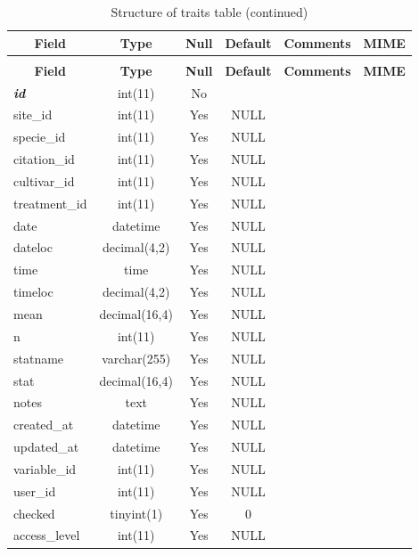 \begin{enumerate}
%
%
 \begin{longtable}{|l|c|c|c|l|l|} 
 \caption{Structure of traits table} \label{tab:traits} \\
 \hline \multicolumn{1}{|c|}{\textbf{Field}} & \multicolumn{1}{|c|}{\textbf{Type}} & \multicolumn{1}{|c|}{\textbf{Null}} & \multicolumn{1}{|c|}{\textbf{Default}} & \multicolumn{1}{|c|}{\textbf{Comments}} & \multicolumn{1}{|c|}{\textbf{MIME}} \\ \hline \hline
\endfirsthead
 \caption{Structure of traits table (continued)} \\ 
 \hline \multicolumn{1}{|c|}{\textbf{Field}} & \multicolumn{1}{|c|}{\textbf{Type}} & \multicolumn{1}{|c|}{\textbf{Null}} & \multicolumn{1}{|c|}{\textbf{Default}} & \multicolumn{1}{|c|}{\textbf{Comments}} & \multicolumn{1}{|c|}{\textbf{MIME}} \\ \hline \hline \endhead \endfoot 
\textbf{\textit{id}} & int(11) & No &  &  &  \\ \hline 
site\_id & int(11) & Yes & NULL &  &  \\ \hline 
specie\_id & int(11) & Yes & NULL &  &  \\ \hline 
citation\_id & int(11) & Yes & NULL &  &  \\ \hline 
cultivar\_id & int(11) & Yes & NULL &  &  \\ \hline 
treatment\_id & int(11) & Yes & NULL &  &  \\ \hline 
date & datetime & Yes & NULL &  &  \\ \hline 
dateloc & decimal(4,2) & Yes & NULL &  &  \\ \hline 
time & time & Yes & NULL &  &  \\ \hline 
timeloc & decimal(4,2) & Yes & NULL &  &  \\ \hline 
mean & decimal(16,4) & Yes & NULL &  &  \\ \hline 
n & int(11) & Yes & NULL &  &  \\ \hline 
statname & varchar(255) & Yes & NULL &  &  \\ \hline 
stat & decimal(16,4) & Yes & NULL &  &  \\ \hline 
notes & text & Yes & NULL &  &  \\ \hline 
created\_at & datetime & Yes & NULL &  &  \\ \hline 
updated\_at & datetime & Yes & NULL &  &  \\ \hline 
variable\_id & int(11) & Yes & NULL &  &  \\ \hline 
user\_id & int(11) & Yes & NULL &  &  \\ \hline 
checked & tinyint(1) & Yes & 0 &  &  \\ \hline 
access\_level & int(11) & Yes & NULL &  &  \\ \hline 
 \end{longtable}



\end{enumerate}

